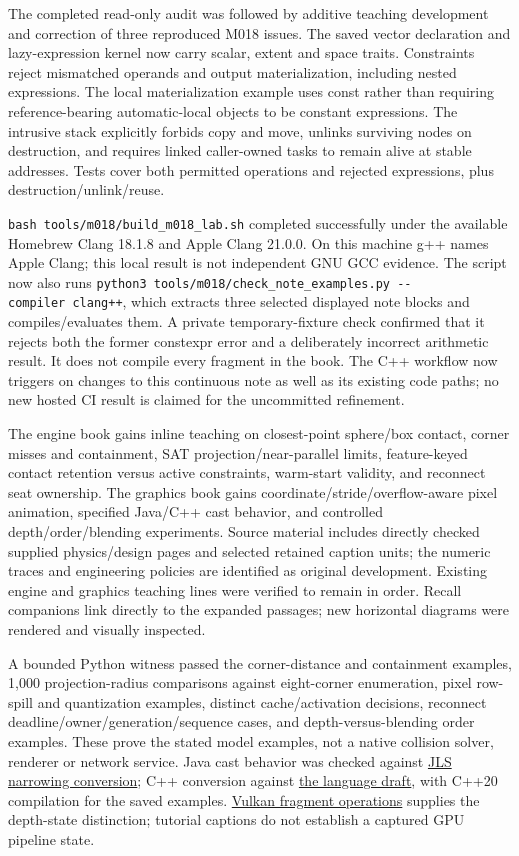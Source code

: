 The completed read-only audit was followed by additive teaching development and correction of three reproduced M018 issues. The saved vector declaration and lazy-expression kernel now carry scalar, extent and space traits. Constraints reject mismatched operands and output materialization, including nested expressions. The local materialization example uses const rather than requiring reference-bearing automatic-local objects to be constant expressions. The intrusive stack explicitly forbids copy and move, unlinks surviving nodes on destruction, and requires linked caller-owned tasks to remain alive at stable addresses. Tests cover both permitted operations and rejected expressions, plus destruction/unlink/reuse.

\texttt{bash\ tools/m018/build\_m018\_lab.sh} completed successfully under the available Homebrew Clang 18.1.8 and Apple Clang 21.0.0. On this machine g++ names Apple Clang; this local result is not independent GNU GCC evidence. The script now also runs \texttt{python3\ tools/m018/check\_note\_examples.py\ -\/-compiler\ clang++}, which extracts three selected displayed note blocks and compiles/evaluates them. A private temporary-fixture check confirmed that it rejects both the former constexpr error and a deliberately incorrect arithmetic result. It does not compile every fragment in the book. The C++ workflow now triggers on changes to this continuous note as well as its existing code paths; no new hosted CI result is claimed for the uncommitted refinement.

The engine book gains inline teaching on closest-point sphere/box contact, corner misses and containment, SAT projection/near-parallel limits, feature-keyed contact retention versus active constraints, warm-start validity, and reconnect seat ownership. The graphics book gains coordinate/stride/overflow-aware pixel animation, specified Java/C++ cast behavior, and controlled depth/order/blending experiments. Source material includes directly checked supplied physics/design pages and selected retained caption units; the numeric traces and engineering policies are identified as original development. Existing engine and graphics teaching lines were verified to remain in order. Recall companions link directly to the expanded passages; new horizontal diagrams were rendered and visually inspected.

A bounded Python witness passed the corner-distance and containment examples, 1,000 projection-radius comparisons against eight-corner enumeration, pixel row-spill and quantization examples, distinct cache/activation decisions, reconnect deadline/owner/generation/sequence cases, and depth-versus-blending order examples. These prove the stated model examples, not a native collision solver, renderer or network service. Java cast behavior was checked against \href{https://docs.oracle.com/javase/specs/jls/se21/html/jls-5.html\#jls-5.1.3}{JLS narrowing conversion}; C++ conversion against \href{https://eel.is/c++draft/conv.fpint}{the language draft}, with C++20 compilation for the saved examples. \href{https://docs.vulkan.org/spec/latest/chapters/fragops.html}{Vulkan fragment operations} supplies the depth-state distinction; tutorial captions do not establish a captured GPU pipeline state.

